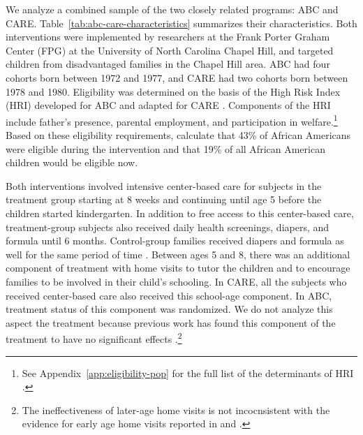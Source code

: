We analyze a combined sample of the two closely related programs: ABC and CARE. Table~\ref{tab:abc-care-characteristics} summarizes their characteristics. Both interventions were implemented by researchers at the Frank Porter Graham Center (FPG) at the University of North Carolina Chapel Hill, and targeted children from disadvantaged families in the Chapel Hill area. ABC had four cohorts born between 1972 and 1977, and CARE had two cohorts born between 1978 and 1980. Eligibility was determined on the basis of the High Risk Index (HRI) developed for ABC and adapted for CARE \citep{Ramey_Smith_1977_AJMD,Wasik_Ramey_etal_1990_CD}. Components of the HRI include father's presence, parental employment, and participation in welfare.\footnote{See Appendix~\ref{app:eligibility-pop} for the full list of the determinants of HRI \citep{Ramey_Smith_1977_AJMD, Wasik_Ramey_etal_1990_CD, Ramey_Campbell_1991_childreninpoverty}.} Based on these eligibility requirements, \citet{Garcia_Heckman_Leaf_etal_2017_Comp_CBA_Unpublished} calculate that 43\% of African Americans were eligible during the intervention and that 19\% of all African American children would be eligible now.

Both interventions involved intensive center-based care for subjects in the treatment group starting at 8 weeks and continuing until age 5 before the children started kindergarten. In addition to free access to this center-based care, treatment-group subjects also received daily health screenings, diapers, and formula until 6 months. Control-group families received diapers and formula as well for the same period of time \citep{Wasik_Ramey_etal_1990_CD,Ramey_Campbell_1991_childreninpoverty}. Between ages 5 and 8, there was an additional component of treatment with home visits to tutor the children and to encourage families to be involved in their child's schooling. In CARE, all the subjects who received center-based care also received this school-age component. In ABC, treatment status of this component was randomized. We do not analyze this aspect the treatment because previous work has found this component of the treatment to have no significant effects \citep{Campbell_Ramey_etal_2002_ADS,Campbell_Conti_etal_2014_EarlyChildhoodInvestments}.\footnote{The ineffectiveness of later-age home visits is not incocnsistent with the evidence for early age home visits reported in \citet{Doyle_etal_2015_LCC_Early-Skill-Formation-Report} and \citet{Gertler_Heckman_etal_2014_Science}.}

